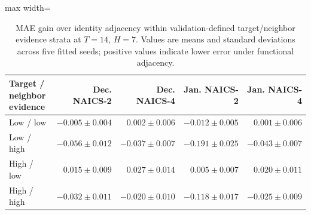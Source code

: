 \begin{table}[!htbp]
\centering
\begingroup
\singlespacing
\fontsize{9pt}{10.5pt}\selectfont
\setlength{\tabcolsep}{4pt}
\renewcommand{\arraystretch}{1.08}
\caption{MAE gain over identity adjacency within validation-defined target/neighbor evidence strata at $T=14$, $H=7$. Values are means and standard deviations across five fitted seeds; positive values indicate lower error under functional adjacency.}
\label{tab:graph_transfer_summary}
\begin{adjustbox}{max width=\linewidth}
\begin{tabular}{lrrrr}
\toprule
Target / neighbor evidence & Dec. NAICS-2 & Dec. NAICS-4 & Jan. NAICS-2 & Jan. NAICS-4 \\
\midrule
Low / low & $-0.005\pm 0.004$ & $0.002\pm 0.006$ & $-0.012\pm 0.005$ & $0.001\pm 0.006$ \\
Low / high & $-0.056\pm 0.012$ & $-0.037\pm 0.007$ & $-0.191\pm 0.025$ & $-0.043\pm 0.007$ \\
High / low & $0.015\pm 0.009$ & $0.027\pm 0.014$ & $0.005\pm 0.007$ & $0.020\pm 0.011$ \\
High / high & $-0.032\pm 0.011$ & $-0.020\pm 0.010$ & $-0.118\pm 0.017$ & $-0.025\pm 0.009$ \\
\bottomrule
\end{tabular}
\end{adjustbox}
\endgroup
\end{table}
